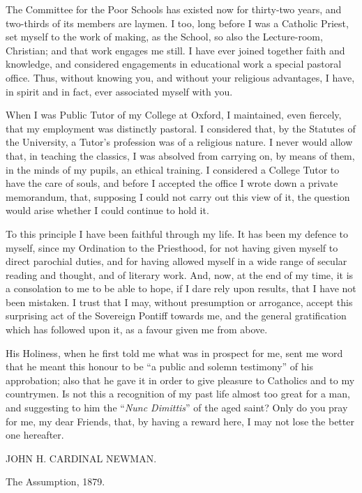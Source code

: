 The Committee for the Poor Schools has existed now for thirty-two
years, and two-thirds of its members are laymen. I too, long before I
was a Catholic Priest, set myself to the work of making, as the
School, so also the Lecture-room, Christian; and that work engages me
still. I have ever joined together faith and knowledge, and considered
engagements in educational work a special pastoral office. Thus,
without knowing you, and without your religious advantages, I
have, in spirit and in fact, ever associated myself with you.

When I was Public Tutor of my College at Oxford, I maintained, even
fiercely, that my employment was distinctly pastoral. I considered
that, by the Statutes of the University, a Tutor's profession was of a
religious nature. I never would allow that, in teaching the classics,
I was absolved from carrying on, by means of them, in the minds of my
pupils, an ethical training. I considered a College Tutor to have the
care of souls, and before I accepted the office I wrote down a private
memorandum, that, supposing I could not carry out this view of it, the
question would arise whether I could continue to hold it.

To this principle I have been faithful through my life. It has been
my defence to myself, since my Ordination to the Priesthood, for not
having given myself to direct parochial duties, and for having allowed
myself in a wide range of secular reading and thought, and of literary
work. And, now, at the end of my time, it is a consolation to me to be
able to hope, if I dare rely upon results, that I have not been
mistaken. I trust that I may, without presumption or arrogance, accept this surprising act of the Sovereign Pontiff towards me, and
the general gratification which has followed upon it, as a favour
given me from above.

His Holiness, when he first told me what was in prospect for me,
sent me word that he meant this honour to be ``a public and solemn
testimony'' of his approbation; also that he gave it in order to
give pleasure to Catholics and to my countrymen. Is not this a
recognition of my past life almost too great for a man, and suggesting
to him the ``\emph{Nunc Dimittis}'' of the aged saint? Only do
you pray for me, my dear Friends, that, by having a reward here, I may
not lose the better one hereafter.

JOHN H. CARDINAL NEWMAN.

The Assumption, 1879.


